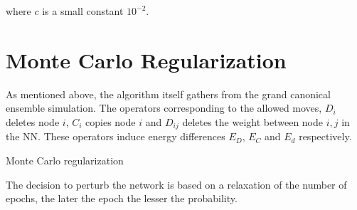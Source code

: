 where $c$ is a small constant $10^{-2}$.

\section{Monte Carlo Regularization}

As mentioned above, the algorithm itself gathers from the grand canonical ensemble simulation. The operators corresponding to the allowed moves, $D_i$ deletes node $i$, $C_i$ copies node $i$ and $D_{ij}$ deletes the weight between node $i,j$ in the NN. These operators induce energy differences $E_D$, $E_C$ and $E_d$ respectively. 

\begin{algorithm}
    \caption{Monte Carlo regularization}
    \begin{algorithmic}[1]
        \EndIf
    \end{algorithmic}
\end{algorithm}

The decision to perturb the network is based on a relaxation of the number of epochs, the later the epoch the lesser the probability.